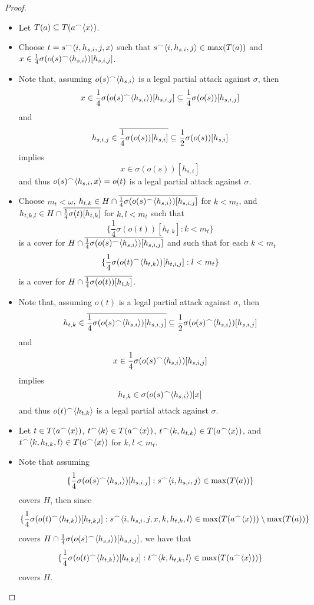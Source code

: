 \begin{proof}
  \begin{itemize}
    \item Let $T(a)\subseteq T(a{^\frown}\langle x\rangle)$.
    \item Choose $t=s{^\frown}\langle i,h_{s,i},j,x\rangle$ such that $s{^\frown}\langle i,h_{s,i},j\rangle\in\max(T(a))$ and $x\in \frac{1}{4}\sigma(o(s){^\frown}\langle h_{s,i}\rangle)[h_{s,i,j}]$. 
    \item Note that, assuming $o(s){^\frown}\langle h_{s,i}\rangle$ is a legal partial attack against $\sigma$, then
      \[
        x
          \in 
        \frac{1}{4}\sigma(o(s){^\frown}\langle h_{s,i}\rangle)[h_{s,i,j}]
          \subseteq
        \frac{1}{4}\sigma(o(s))[h_{s,i,j}]
      \]
    and
      \[
        h_{s,i,j}
          \in 
        \overline{\frac{1}{4}\sigma(o(s))[h_{s,i}]}
          \subseteq 
        \frac{1}{2}\sigma(o(s))[h_{s,i}]
      \]
    implies
      \[
        x
          \in 
        \sigma(o(s))[h_{s,i}]
      \]
    and thus $o(s){^\frown}\langle h_{s,i},x\rangle=o(t)$ is a legal partial attack against $\sigma$.
    \item Choose $m_t<\omega$, $h_{t,k}\in H\cap \overline{\frac{1}{4}\sigma(o(s){^\frown}\langle h_{s,i}\rangle)[h_{s,i,j}]}$ for $k<m_t$, and $h_{t,k,l}\in H\cap\overline{\frac{1}{4}\sigma(t)[h_{t,k}]}$ for $k,l<m_t$ such that
      \[
        \{\frac{1}{4}\sigma(o(t))[h_{t,k}]:k<m_t\}
      \]
    is a cover for $H\cap \overline{\frac{1}{4}\sigma(o(s){^\frown}\langle h_{s,i}\rangle)[h_{s,i,j}]}$ and such that for each $k<m_t$
      \[
        \{\frac{1}{4}\sigma(o(t){^\frown}\langle h_{t,k}\rangle)[h_{t,i,j}]:l<m_t\}
      \]
    is a cover for $H\cap\overline{\frac{1}{4}\sigma(o(t))[h_{t,k}]}$.
    \item Note that, assuming $o(t)$ is a legal partial attack against $\sigma$, then
      \[
        h_{t,k}
          \in 
        \overline{\frac{1}{4}\sigma(o(s){^\frown}\langle h_{s,i}\rangle)[h_{s,i,j}]}
          \subseteq
        \frac{1}{2}\sigma(o(s){^\frown}\langle h_{s,i}\rangle)[h_{s,i,j}]
      \]
    and
      \[
        x
          \in 
        \frac{1}{4}\sigma(o(s){^\frown}\langle h_{s,i}\rangle)[h_{s,i,j}]
      \]
    implies
      \[
        h_{t,k}
          \in
        \sigma(o(s){^\frown}\langle h_{s,i}\rangle)[x]
      \]
    and thus $o(t){^\frown}\langle h_{t,k}\rangle$ is a legal partial attack against $\sigma$.
    \item Let $t\in T(a{^\frown}\langle x\rangle)$, $t{^\frown}\langle k\rangle\in T(a{^\frown}\langle x\rangle)$, $t{^\frown}\langle k,h_{t,k}\rangle\in T(a{^\frown}\langle x\rangle)$, and $t{^\frown}\langle k,h_{t,k},l\rangle\in T(a{^\frown}\langle x\rangle)$ for $k,l<m_t$.
    \item Note that assuming
      \[
        \{\frac{1}{4}\sigma(o(s){^\frown}\langle h_{s,i}\rangle)[h_{s,i,j}] : s{^\frown}\langle i,h_{s,i},j\rangle\in\max(T(a))\}
      \]
    covers $H$, then since
      \[
        \{\frac{1}{4}\sigma(o(t){^\frown}\langle h_{t,k}\rangle)[h_{t,k,l}] : s{^\frown}\langle i,h_{s,i},j,x,k,h_{t,k},l\rangle\in\max(T(a{^\frown}\langle x\rangle))\setminus\max(T(a))\}
      \]
    covers $H\cap \frac{1}{4}\sigma(o(s){^\frown}\langle h_{s,i}\rangle)[h_{s,i,j}]$, we have that
      \[
        \{\frac{1}{4}\sigma(o(t){^\frown}\langle h_{t,k}\rangle)[h_{t,k,l}] : t{^\frown}\langle k,h_{t,k},l\rangle\in\max(T(a{^\frown}\langle x\rangle))\}
      \]
    covers $H$.
  \end{itemize}


\end{proof}
